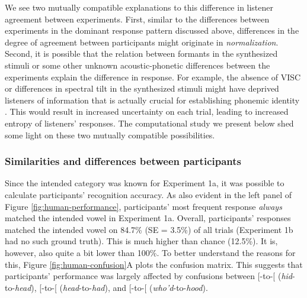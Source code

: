 \documentclass[preprint]{JASA}
\begin{document}
We see two mutually compatible explanations to this difference in listener agreement between experiments. First, similar to the differences between experiments in the dominant response pattern discussed above, differences in the degree of agreement between participants might originate in \emph{normalization}. Second, it is possible that the relation between formants in the synthesized stimuli or some other unknown acoustic-phonetic differences between the experiments explain the difference in response. For example, the absence of VISC or differences in spectral tilt in the synthesized stimuli might have deprived listeners of information that is actually crucial for establishing phonemic identity \citep{hillenbrand-nearey1999}. This would result in increased uncertainty on each trial, leading to increased entropy of listeners' responses. The computational study we present below shed some light on these two mutually compatible possibilities.

\subsubsection{Similarities and differences between participants}\label{similarities-and-differences-between-participants}

Since the intended category was known for Experiment 1a, it was possible to calculate participants' recognition accuracy. As also evident in the left panel of Figure \ref{fig:human-performance}, participants' most frequent response \emph{always} matched the intended vowel in Experiment 1a. Overall, participants' responses matched the intended vowel on 84.7\% (SE = 3.5\%) of all trials (Experiment 1b had no such ground truth). This is much higher than chance (12.5\%). It is, however, also quite a bit lower than 100\%. To better understand the reasons for this, Figure \ref{fig:human-confusion}A plots the confusion matrix. This suggests that participants' performance was largely affected by confusions between {[}\ipatext{ɪ}{]}-to-{[}\ipatext{ɛ}{]} (\emph{hid}-to-\emph{head}), {[}\ipatext{ɛ}{]}-to-{[}\ipatext{æ}{]} (\emph{head}-to-\emph{had}), and {[}\ipatext{u}{]}-to-{[}\ipatext{ʊ}{]} (\emph{who'd}-to-\emph{hood}).
\end{document}
